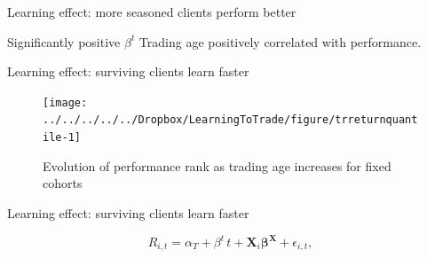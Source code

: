 \documentclass{beamer}
\begin{document}
\begin{frame}{Learning effect: more seasoned clients perform better}
\begin{block}{Significantly positive $\beta^t$}
Trading age positively correlated with performance.
\end{block}


\end{frame}


\begin{frame}{Learning effect: surviving clients learn faster}
	\begin{figure}
		\caption{Evolution of performance rank as trading age increases for fixed cohorts}
			\texttt{[image: ../../../../../Dropbox/LearningToTrade/figure/trreturnquantile-1]}
	\end{figure}
\end{frame}



\begin{frame}{Learning effect: surviving clients learn faster}

	\begin{equation}
	\label{eq:rregress}
	R_{i,t} = \alpha_T + \beta^{t} \, t +  \bm{X}_i \bm{\beta}^{\bm{X}} + \epsilon_{i,t},
	\end{equation}


\end{frame}
\end{document}

